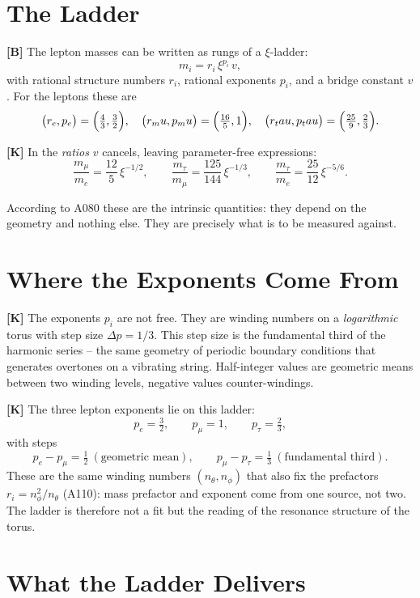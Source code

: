 \section{The Ladder}

\textbf{[B]} The lepton masses can be written as rungs of a $\xi$-ladder:
\[
  m_i = r_i\,\xi^{p_i}\,v ,
\]
with rational structure numbers $r_i$, rational exponents $p_i$, and a bridge
constant $v$. For the leptons these are
\[
  \bigl(r_e,p_e\bigr) = \Bigl(\tfrac43,\tfrac32\Bigr),\quad
  \bigl(r_\mu,p_\mu\bigr) = \Bigl(\tfrac{16}{5},1\Bigr),\quad
  \bigl(r_\tau,p_\tau\bigr) = \Bigl(\tfrac{25}{9},\tfrac23\Bigr).
\]

\textbf{[K]} In the \emph{ratios} $v$ cancels, leaving parameter-free expressions:
\[
  \frac{m_\mu}{m_e} = \frac{12}{5}\,\xi^{-1/2},\qquad
  \frac{m_\tau}{m_\mu} = \frac{125}{144}\,\xi^{-1/3},\qquad
  \frac{m_\tau}{m_e} = \frac{25}{12}\,\xi^{-5/6}.
\]

According to A080 these are the intrinsic quantities: they depend on the geometry
and nothing else. They are precisely what is to be measured against.

\section{Where the Exponents Come From}

\textbf{[K]} The exponents $p_i$ are not free. They are winding numbers on a
\emph{logarithmic} torus with step size $\Delta p = 1/3$. This step size is the
fundamental third of the harmonic series -- the same geometry of periodic boundary
conditions that generates overtones on a vibrating string. Half-integer values
are geometric means between two winding levels, negative values counter-windings.

\textbf{[K]} The three lepton exponents lie on this ladder:
\[
  p_e = \tfrac32,\qquad p_\mu = 1,\qquad p_\tau = \tfrac23,
\]
with steps
\[
  p_e - p_\mu = \tfrac12 \ (\text{geometric mean}),\qquad
  p_\mu - p_\tau = \tfrac13 \ (\text{fundamental third}).
\]
These are the same winding numbers $(n_\theta, n_\phi)$ that also fix the prefactors
$r_i = n_\phi^2/n_\theta$ (A110): mass prefactor and exponent come from one source,
not two. The ladder is therefore not a fit but the reading of the resonance
structure of the torus.

\section{What the Ladder Delivers}

